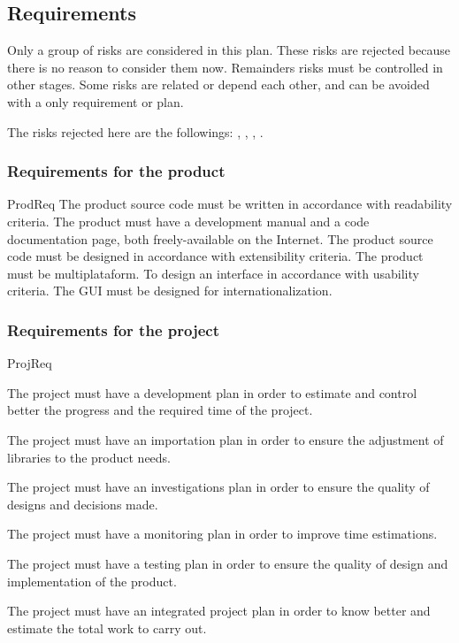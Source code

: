 \documentclass[twocolumn, 9pt]{extarticle}
\begin{document}
\subsection{Requirements}
Only a group of risks are considered in this plan. These risks are
rejected because there is no reason to consider them now. Remainders
risks must be controlled in other stages. Some risks are related or
depend each other, and can be avoided with a only requirement or
plan.

The risks rejected here are the followings: ,
, , .

\subsubsection{Requirements for the product}
\label{sssec:prodreq}

\begin{labeledpars}{ProdReq}
   The product source code must be
  written in accordance with readability criteria. The product must
  have a development manual and a code documentation page, both
  freely-available on the Internet.
   The product source code must be designed in
  accordance with extensibility criteria. The product must be
  multiplataform.
   To design an interface in accordance with
  usability criteria. The GUI must be designed for
  internationalization.
\end{labeledpars}

\subsubsection{Requirements for the project}
\begin{labeledpars}{ProjReq}

   The project must have a development
  plan in order to estimate and control better the progress and the
  required time of the project.

   The project must have an importation
  plan in order to ensure the adjustment of libraries to the product
  needs.

   The project must have an
  investigations plan in order to ensure the quality of designs and
  decisions made.

   The project must have a monitoring plan
  in order to improve time estimations.

   The project must have a testing plan
  in order to ensure the quality of design and implementation of the
  product.

   The project must have an integrated
  project plan in order to know better and estimate the total work to
  carry out.
\end{labeledpars}
\end{document}

